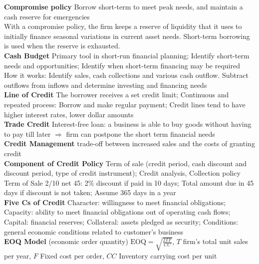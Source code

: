 \documentclass[12pt,landscape, a4paper]{article}
\theoremstyle{remark}
\begin{document}
\begin{multicols*}{3}
\textbf{Compromise policy} Borrow short-term to meet peak needs, and maintain a cash reserve for emergencies\\
With a compromise policy, the firm keeps a reserve of liquidity that it uses to initially finance seasonal variations in current asset needs. Short-term borrowing is used when the reserve is exhausted.\\

\textbf{Cash Budget} Primary tool in short-run financial planning; Identify short-term needs and opportunities; Identify when short-term financing may be required\\
How it works: Identify sales, cash collections and various cash outflow. Subtract outflows from inflows and determine investing and financing needs\\

\textbf{Line of Credit} The borrower receives a set credit limit; Continuous and repeated process: Borrow and make regular payment; Credit lines tend to have higher interest rates, lower dollar amounts\\

\textbf{Trade Credit}  Interest-free loan: a business is able to buy goods without having to pay till later $\Rightarrow$ firm can postpone the short term financial needs\\

\textbf{Credit Management} trade-off between increased sales and the costs of granting credit\\

\textbf{Component of Credit Policy} Term of sale (credit period, cash discount and discount period, type of credit instrument); Credit analysis, Collection policy\\
Term of Sale 2/10 net 45:  2\% discount if paid in 10 days; Total amount due in 45 days if discount is not taken; Assume 365 days in a year\\

\textbf{Five Cs of Credit} Character: willingness to meet financial obligations; Capacity: ability to meet financial obligations out of operating cash flows; Capital: financial reserves; Collateral: assets pledged as security; Conditions: general economic conditions related to customer’s business\\

\textbf{EOQ Model} (economic order quantity) $\text{EOQ} = \sqrt{\frac{2TF}{CC}}$, $T$ firm's total unit sales per year, $F$ Fixed cost per order, $CC$ Inventory carrying cost per unit\\


\end{multicols*}
\end{document}
